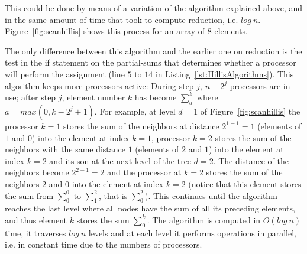 \documentclass[Ingles]{ic-tese-v1}
\newcommand{\rfig}[1]{Figure~\ref{fig:#1}}
\newcommand{\rlsts}[2]{Listing~\ref{lst:#1}{#2}}
\begin{document}
This could be done  by means of a variation of the  algorithm explained above, and  in the
same  amount of time that took to compute reduction, i.e. $log\ n$.
\rfig{scanhillis} shows this process for an array of 8
elements.

The only difference between this algorithm and the earlier one on reduction is
the test in the if statement on the partial-sums
that determines whether a processor will perform the assignment (line $5$ to $14$ in \rlsts{HillisAlgorithms}). This
algorithm keeps more processors active: During step $j$, $n - 2^{j}$ processors
are in use; after step $j$, element number $k$ has become $\sum_{a}^{k}$ where
$a = max(0, k - 2^{j} + 1)$. For  example, at  level $d  = 1$  of
\rfig{scanhillis} the processor $k = 1$ stores the sum of the neighbors at
distance $2^{1-1} = 1$ (elements of $1$ and $0$) into the element at index $k =
1$, processor $k = 2$ stores the sum of the neighbors with the same
distance $1$ (elements of $2$ and $1$) into the element at index $k = 2$ and
its son at the  next level of  the tree $d = 2$.
The distance of the neighbors become  $2^{2-1} = 2$ and the processor at $k = 2$ stores the
sum of the neighbors $2$ and $0$ into the element at index $k = 2$ (notice that this element stores the
sum from $\sum_{0}^{0}$ to $\sum_{1}^{2}$, that is $\sum_{0}^{2}$). This continues until
the algorithm reaches the last level where all nodes have the sum of all its preceding
elements, and thus  element $k$ stores the sum $\sum_{0}^{k}$.
The algorithm
is computed in $O(log\ n)$ time, it traverses $log\ n$ levels and at each level it
performs operations in parallel, i.e. in constant time due to the numbers of processors.
\end{document}

